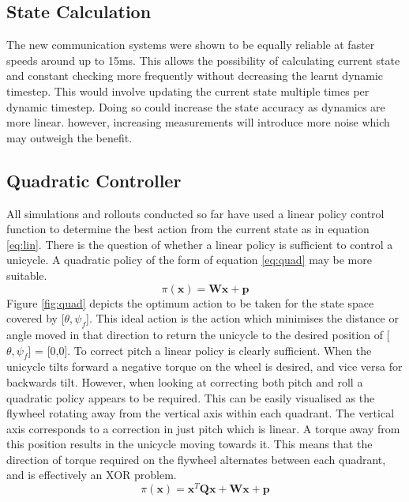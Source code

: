\documentclass[twoside,twocolumn,12pt]{article}
\begin{document}
\subsection{State Calculation}
The new communication systems were shown to be equally reliable at faster speeds around up to 15ms. This allows the possibility of calculating current state and constant checking more frequently without decreasing the learnt dynamic timestep.
\newline
This would involve updating the current state multiple times per dynamic timestep. Doing so could increase the state accuracy as dynamics are more linear. however, increasing measurements will introduce more noise which may outweigh the benefit. 
\subsection{Quadratic Controller}
All simulations and rollouts conducted so far have used a linear policy control function to determine the best action from the current state as in equation \ref{eq:lin}. There is the question of whether a linear policy is sufficient to control a unicycle. A quadratic policy of the form of equation \ref{eq:quad} may be more suitable.
\begin{equation}
\pi (\textbf{x}) = \textbf{Wx}+\textbf{p}
\label{eq:lin}
\end{equation}
Figure \ref{fig:quad} depicts the optimum action to be taken for the state space covered by [$\theta ,\psi_f$]. This ideal action is the action which minimises the distance or angle moved in that direction to return the unicycle to the desired position of [$\theta ,\psi_f$] = [0,0]. 
\newline
To correct pitch a linear policy is clearly sufficient. When the unicycle tilts forward a negative torque on the wheel is desired, and vice versa for backwards tilt. However, when looking at correcting both pitch and roll a quadratic policy appears to be required. This can be easily visualised as the flywheel rotating away from the vertical axis within each quadrant. The vertical axis corresponds to a correction in just pitch which is linear. A torque away from this position results in the unicycle moving towards it. This means that the direction of torque required on the flywheel alternates between each quadrant, and is effectively an XOR problem. \cite{roderigo} 
\begin{equation}
\pi (\textbf{x}) = \textbf{x}^T\textbf{Qx} + \textbf{Wx} + \textbf{p}
\label{eq:quad}
\end{equation}
\end{document}
